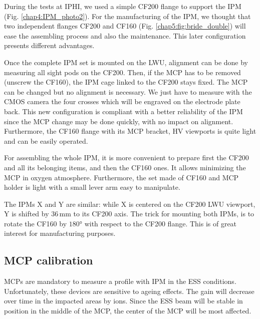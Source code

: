 During the tests at IPHI, we used a simple CF200 flange to support the IPM (Fig. \ref{chap4:IPM_photo2}). For the manufacturing of the IPM, we thought that two independent flanges CF200 and CF160 (Fig. \ref{chap5:fig:bride_double}) will ease the assembling process and also the maintenance. This later configuration presents different advantages.



Once the complete IPM set is mounted on the LWU, alignment can be done by measuring all sight pods on the CF200. Then, if the MCP has to be removed (unscrew the CF160), the IPM cage linked to the CF200 stays fixed. The MCP can be changed but no alignment is necessary. We just have to measure with the CMOS camera the four crosses which will be engraved on the electrode plate back. This new configuration is compliant with a better reliability of the IPM since the MCP change may be done quickly, with no impact on alignment. Furthermore, the CF160 flange with its MCP bracket, HV viewports is quite light and can be easily operated.

For assembling the whole IPM, it is more convenient to prepare first the CF200 and all its belonging items, and then the CF160 ones. It allows minimizing the MCP in oxygen atmosphere. Furthermore, the set made of CF160 and MCP holder is light with a small lever arm easy to manipulate.

The IPMs X and Y are similar: while X is centered on the CF200 LWU viewport, Y is shifted by $36\,\mathrm{mm}$ to its CF200 axis. The trick for mounting both IPMs, is to rotate the CF160 by $180°$ with respect to the CF200 flange. This is of great interest for manufacturing purposes.

\subsection*{MCP calibration}


MCPs are mandatory to measure a profile with IPM in the ESS conditions. Unfortunately, these devices are sensitive to ageing effects. The gain will decrease over  time in the impacted areas by ions. Since the ESS beam will be stable in position in the middle of the MCP, the center of the MCP will be most affected.

